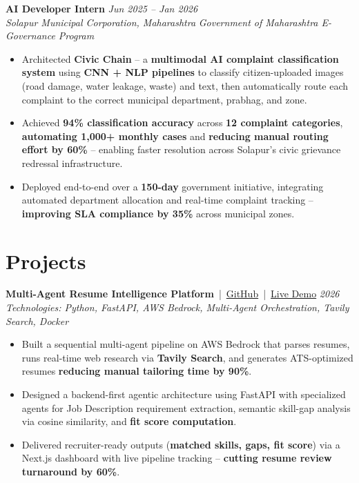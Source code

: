 \documentclass[10pt,a4paper]{article}
\newcommand{\metric}[1]{\textbf{#1}}
\begin{document}
\textbf{AI Developer Intern} \hfill \textit{Jun 2025 -- Jan 2026} \\
\textit{Solapur Municipal Corporation, Maharashtra} \hfill \textit{Government of Maharashtra E-Governance Program}
\begin{itemize}
    \item Architected \textbf{Civic Chain} -- a \textbf{multimodal AI complaint classification system} using \textbf{CNN + NLP pipelines} to classify citizen-uploaded images (road damage, water leakage, waste) and text, then automatically route each complaint to the correct municipal department, prabhag, and zone.
    \item Achieved \metric{94\% classification accuracy} across \metric{12 complaint categories}, \metric{automating 1,000+ monthly cases} and \metric{reducing manual routing effort by 60\%} -- enabling faster resolution across Solapur's civic grievance redressal infrastructure.
    \item Deployed end-to-end over a \metric{150-day} government initiative, integrating automated department allocation and real-time complaint tracking -- \metric{improving SLA compliance by 35\%} across municipal zones.
\end{itemize}

\vspace{-2pt}
\section*{Projects}
\vspace{1pt}

\textbf{Multi-Agent Resume Intelligence Platform} \,|\,
\href{https://github.com/raza-shaikh-ai/Ai-agent-resume}{GitHub} \,|\,
\href{https://ai-agent-resume-three.vercel.app/}{Live Demo}
\hfill \textit{2026} \\
\textit{Technologies: Python, FastAPI, AWS Bedrock, Multi-Agent Orchestration, Tavily Search, Docker}
\begin{itemize}
    \item Built a sequential multi-agent pipeline on AWS Bedrock that parses resumes, runs real-time web research via \textbf{Tavily Search}, and generates ATS-optimized resumes \metric{reducing manual tailoring time by 90\%}.
    \item Designed a backend-first agentic architecture using FastAPI with specialized agents for Job Description requirement extraction, semantic skill-gap analysis via cosine similarity, and \textbf{fit score computation}.
    \item Delivered recruiter-ready outputs (\textbf{matched skills, gaps, fit score}) via a Next.js dashboard with live pipeline tracking -- \metric{cutting resume review turnaround by 60\%}.
\end{itemize}
\end{document}
